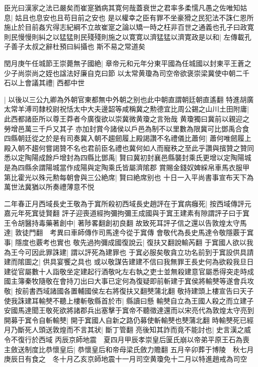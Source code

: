 臣光曰漢家之法已嚴矣而崔寔猶病其寛何哉蓋衰世之君率多柔懦凡愚之佐唯知姑息|{
	姑且也息安也且苟目前之安也}
是以權幸之臣有罪不坐豪猾之民犯法不誅仁恩所施止於目前姦宄得志紀綱不立故崔寔之論以矯一時之枉非百世之通義也孔子曰政寛則民慢慢則糾之以猛猛則民殘殘則施之以寛寛以濟猛猛以濟寛政是以和|{
	左傳載孔子善子太叔之辭杜預曰糾攝也}
斯不易之常道矣

閏月庚午任城節王崇薨無子國絶|{
	章帝元和元年分東平國為任城國以封東平王蒼之少子尚崇尚之姪也諡法好廉自克曰節}
以太常黄瓊為司空帝欲褒崇梁冀使中朝二千石以上會議其禮|{
	西都中世}


|{
	以後以三公九卿為外朝官東都無中外朝之别也此中朝直謂朝廷朝直遙翻}
特進胡廣太常羊溥司隸校尉祝恬太中大夫邊韶等咸稱冀之勲德宜比周公錫之山川土田附庸|{
	此西都諸臣所以尊王莽者今廣復欲以崇冀微黄瓊之言殆哉}
黄瓊獨曰冀前以親迎之勞增邑萬三千戶又其子亦加封賞今諸侯以戶邑為制不以里數為限冀可比鄧禹合食四縣朝廷從之於是有司奏冀入朝不趨劒履上殿謁讚不名禮儀比蕭何|{
	蕭何唯劒履上殿入朝不趨何嘗謁贊不名也君前臣名禮也冀何如人而寵秩之至此乎讚與擯贊之贊同}
悉以定陶陽成餘戶增封為四縣比鄧禹|{
	賢曰冀初封襄邑縣襲封乘氏更增以定陶陽城是為四縣余謂陽城當作成陽與定陶乘氏皆屬濟隂郡}
賞賜金錢奴婢綵帛車馬衣服甲第比霍光以殊元勲每朝會與三公絶席|{
	賢曰絶席别也}
十日一入平尚書事宣布天下為萬世法冀猶以所奏禮薄意不悦

二年春正月西域長史王敬為于窴所殺初西域長史趙評在于窴病癰死|{
	按西域傳評元嘉元年死窴徒賢翻}
評子迎喪道經拘彌拘彌王成國與于窴王建素有隙謂評子曰于窴王令胡醫持毒藥著創中|{
	著陟畧翻創初良翻}
故致死耳評子信之還以告敦煌太守馬達|{
	敦徒門翻　考異曰車師傳作司馬達今從于窴傳}
會敬代為長史馬達令敬隱覈于窴事|{
	隱度也覈考也實也}
敬先過拘彌成國復說云|{
	復扶又翻說輸芮翻}
于窴國人欲以我為王今可因此罪誅建|{
	謂以評死為建罪也}
于窴必服矣敬貪立功名前到于窴設供具請建而隂圖之|{
	供具宴饗之具也}
或以敬謀告建建不信曰我無罪王長史何為欲殺我旦日建從官屬數十人詣敬坐定建起行酒敬叱左右執之吏士並無殺建意官屬悉得突走時成國主簿秦牧隨敬在會持刀出曰大事已定何為復疑即前斬建于窴侯將輸僰等遂會兵攻敬|{
	按前書西域諸國各置輔國侯左右將復扶又翻僰蒲北翻}
敬持建頭上樓宣告曰天子使我誅建耳輸僰不聽上樓斬敬縣首於市|{
	縣讀曰懸}
輸僰自立為王國人殺之而立建子安國馬達聞王敬死欲將諸郡兵出塞擊于窴帝不聽徵達還而以宋亮代為敦煌太守亮到開募于窴令自斬輸僰|{
	開于窴國人自新之路仍募使斬輸僰也僰蒲北翻}
時輸僰死已經月乃斷死人頭送敦煌而不言其狀|{
	斷丁管翻}
亮後知其詐而竟不能討也|{
	史言漢之威令不復行於西域}
丙辰京師地震　夏四月甲辰孝崇皇后匽氏崩以帝弟平原王石為喪主斂送制度比恭懷皇后|{
	恭懷皇后和帝母梁氏斂力贍翻}
五月辛卯葬于博陵　秋七月庚辰日有食之　冬十月乙亥京師地震十一月司空黄瓊免十二月以特進趙戒為司空


